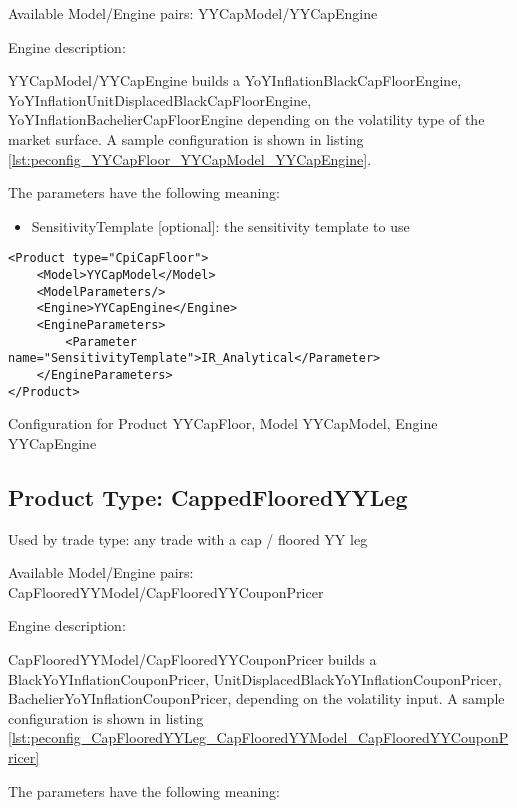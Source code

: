 Available Model/Engine pairs: YYCapModel/YYCapEngine

Engine description:

YYCapModel/YYCapEngine builds a YoYInflationBlackCapFloorEngine, YoYInflationUnitDisplacedBlackCapFloorEngine,
YoYInflationBachelierCapFloorEngine depending on the volatility type of the market surface. A sample configuration is
shown in listing \ref{lst:peconfig_YYCapFloor_YYCapModel_YYCapEngine}.

The parameters have the following meaning:

\begin{itemize}
\item SensitivityTemplate [optional]: the sensitivity template to use 
\end{itemize}

\begin{longlisting}
\begin{verbatim}
<Product type="CpiCapFloor">
    <Model>YYCapModel</Model>
    <ModelParameters/>
    <Engine>YYCapEngine</Engine>
    <EngineParameters>
        <Parameter name="SensitivityTemplate">IR_Analytical</Parameter>
    </EngineParameters>
</Product>
\end{verbatim}
\caption{Configuration for Product YYCapFloor, Model YYCapModel, Engine YYCapEngine}
\label{lst:peconfig_YYCapFloor_YYCapModel_YYCapEngine}
\end{longlisting}

\subsection{Product Type: CappedFlooredYYLeg}

Used by trade type: any trade with a cap / floored YY leg

Available Model/Engine pairs: CapFlooredYYModel/CapFlooredYYCouponPricer

Engine description:

CapFlooredYYModel/CapFlooredYYCouponPricer builds a BlackYoYInflationCouponPricer,
UnitDisplacedBlackYoYInflationCouponPricer, BachelierYoYInflationCouponPricer, depending on the volatility input. A
sample configuration is shown in listing \ref{lst:peconfig_CapFlooredYYLeg_CapFlooredYYModel_CapFlooredYYCouponPricer}

The parameters have the following meaning:

